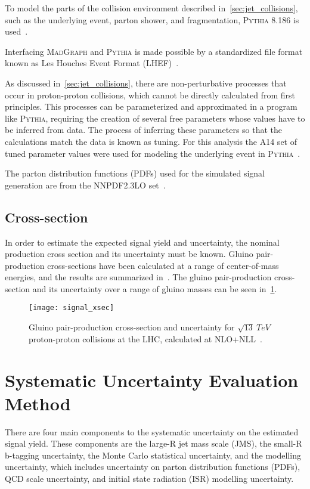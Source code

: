 To model the parts of the collision environment described in~\ref{sec:jet_collisions}, such as the underlying event,
parton shower, and fragmentation, \textsc{Pythia} 8.186 is used~\cite{signal-pythia}.

Interfacing \textsc{MadGraph} and \textsc{Pythia} is made possible by a standardized file format known as Les Houches
Event Format (LHEF)~\cite{signal-lhef}.

As discussed in~\ref{sec:jet_collisions}, there are non-perturbative processes that occur in proton-proton collisions,
which cannot be directly calculated from first principles.
This processes can be parameterized and approximated in a program like \textsc{Pythia},
requiring the creation of several free parameters whose values have to be inferred from data.
The process of inferring these parameters so that the calculations match the data is known as tuning.
For this analysis the A14 set of tuned parameter values were used for modeling the underlying event in
\textsc{Pythia}~\cite{signal-pythia-a14,signal-pythia-tunes}.

The parton distribution functions (PDFs) used for the simulated signal generation are from the NNPDF2.3LO
set~\cite{signal-nnpdf}.

\subsection{Cross-section}\label{subsec:signal_cross_section}
In order to estimate the expected signal yield and uncertainty, the nominal production cross section and its uncertainty
must be known.
Gluino pair-production cross-sections have been calculated at a range of center-of-mass energies, and the results
are summarized in~\cite{signal-xsec}.
The gluino pair-production cross-section and its uncertainty over a range of gluino masses can be seen in~\ref{fig:signal_xsec}.

\begin{figure}[!ht]
    \centering
\texttt{[image: signal\_xsec]}
\caption{Gluino pair-production cross-section and uncertainty for $\sqrt{13}~TeV$ proton-proton collisions at the LHC,
calculated at NLO+NLL~\cite{signal-xsec}.}
\label{fig:signal_xsec}
\end{figure}

\section{Systematic Uncertainty Evaluation Method}\label{sec:signal_systematics_method}
There are four main components to the systematic uncertainty on the
estimated signal yield.
These components are the large-R jet mass scale (JMS), the small-R b-tagging uncertainty, the Monte Carlo statistical
uncertainty, and the modelling uncertainty, which includes uncertainty
on parton distribution functions (PDFs), QCD scale uncertainty, and
initial state radiation (ISR) modelling uncertainty.

